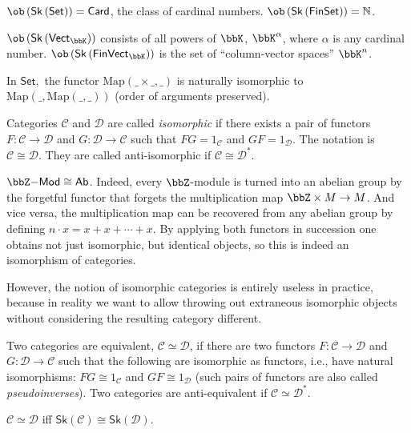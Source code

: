 \begin{example}
    $\ob\left(\mathsf{Sk}\left(\mathsf{Set}\right)\right)=\mathsf{Card}$,
    the class of cardinal numbers. $\ob\left(\mathsf{Sk}\left(\mathsf{FinSet}\right)\right)=\mathbb{N}$. 
\end{example}
%
\begin{example}
    $\ob\left(\mathsf{Sk}\left(\mathsf{Vect}_{\bbK}\right)\right)$ consists
    of all powers of $\bbK$, $\bbK^{\alpha}$, where $\alpha$ is any cardinal
    number. $\ob\left(\mathsf{Sk}\left(\mathsf{FinVect}_{\bbK}\right)\right)$
    is the set of ``column-vector spaces'' $\bbK^{n}$.
    \end{example}
    \begin{example}
    In $\mathsf{Set},$ the functor $\mathrm{Map}\left(\_\times\_,\_\right)$
    is naturally isomorphic to $\mathrm{Map}\left(\_,\mathrm{Map}\left(\_,\_\right)\right)$
    (order of arguments preserved).
\end{example}
\begin{defn}
    Categories $\mathcal{C}$ and $\mathcal{D}$ are called \emph{isomorphic}
    if there exists a pair of functors $F:\mathcal{C}\to\mathcal{D}$
    and $G:\mathcal{D}\to\mathcal{C}$ such that $FG=1_{\mathcal{C}}$
    and $GF=1_{\mathcal{D}}$. The notation is $\mathcal{C}\cong\mathcal{D}$.
    They are called anti-isomorphic if $\mathcal{C}\cong\mathcal{D}^{\ast}$.
\end{defn}

\begin{example}
    $\bbZ\mathsf{-Mod}\cong \mathsf{Ab}$. Indeed, every $\bbZ$-module is turned into an abelian group by the forgetful functor that forgets the multiplication map $\bbZ\times M\to M$. And vice versa, the multiplication map can be recovered from any abelian group by defining $n\cdot x=x+x+\cdots +x$. By applying both functors in succession one obtains not just isomorphic, but identical objects, so this is indeed an isomorphism of categories.
\end{example}

However, the notion of isomorphic categories is entirely useless in
practice, because in reality we want to allow throwing out extraneous
isomorphic objects without considering the resulting category different.
\begin{defn}
 Two categories are equivalent, $\mathcal{C}\simeq\mathcal{D}$,
if there are two functors $F:\mathcal{C}\to\mathcal{D}$ and $G:\mathcal{D}\to\mathcal{C}$
such that the following are isomorphic as functors, i.e., have natural
isomorphisms: $FG\cong1_{\mathcal{C}}$ and $GF\cong1_{\mathcal{D}}$ (such pairs of functors are also called \emph{pseudoinverses}). 
Two categories are anti-equivalent if $\mathcal{C}\simeq\mathcal{D}^{\ast}$.
\end{defn}
%
\begin{prop}
    $\mathcal{C}\simeq\mathcal{D}$ iff $\mathsf{Sk}\left(\mathcal{C}\right)\cong\mathsf{Sk}\left(\mathcal{D}\right)$.
\end{prop}

